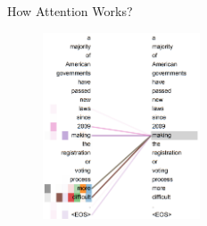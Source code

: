 \documentclass[serif, aspectratio=169]{beamer}
\begin{document}
\begin{frame}{How Attention Works?}
    \begin{figure}
        \centering
        \includegraphics[width=0.415\textwidth]{pic/Attention-1.png}
        \label{fig:Attention-1}
    \end{figure}
\end{frame}
\end{document}
